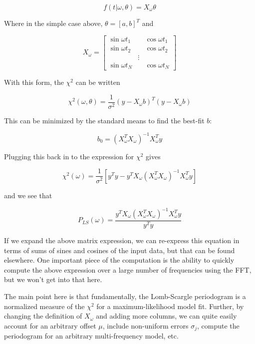 \documentclass[12pt,pdftex]{article}
\begin{document}
\begin{equation}
  f(t|\omega, \theta) = X_\omega \theta
\end{equation}

Where in the simple case above, $\theta = [a, b]^T$ and

\begin{equation}
  X_\omega = \left[\begin{array}{lll}
    \sin\omega t_1 && \cos\omega t_1\\
    \sin\omega t_2 && \cos\omega t_2\\
     & \vdots &\\
    \sin\omega t_N && \cos\omega t_N
  \end{array}\right]
\end{equation}

With this form, the $\chi^2$ can be written

\begin{equation}
\chi^2(\omega, \theta) = \frac{1}{\sigma^2}(y - X_\omega b)^T(y - X_\omega b)
\end{equation}

This can be minimized by the standard means to find the best-fit $b$:

\begin{equation}
  b_0 = (X_\omega^TX_\omega)^{-1}X_\omega^Ty
\end{equation}

Plugging this back in to the expression for $\chi^2$ gives

\begin{equation}
  \chi^2(\omega) = \frac{1}{\sigma^2}\left[
    y^Ty - y^TX_\omega(X_\omega^TX_\omega)^{-1}X_\omega^Ty
    \right]
\end{equation}

and we see that

\begin{equation}
  P_{LS}(\omega) = \frac{y^TX_\omega(X_\omega^TX_\omega)^{-1}X_\omega^Ty}{y^Ty}
\end{equation}

If we expand the above matrix expression, we can re-express this equation in terms of sums of sines and cosines of the input data, but that can be found elsewhere. One important piece of the computation is the ability to quickly compute the above expression over a large number of frequencies using the FFT, but we won't get into that here.

 The main point here is that fundamentally, the Lomb-Scargle periodogram is a normalized measure of the $\chi^2$ for a maximum-likelihood model fit. Further, by changing the definition of $X_\omega$ and adding more columns, we can quite easily account for an arbitrary offset $\mu$, include non-uniform errors $\sigma_j$, compute the periodogram for an arbitrary multi-frequency model, etc.
\end{document}
